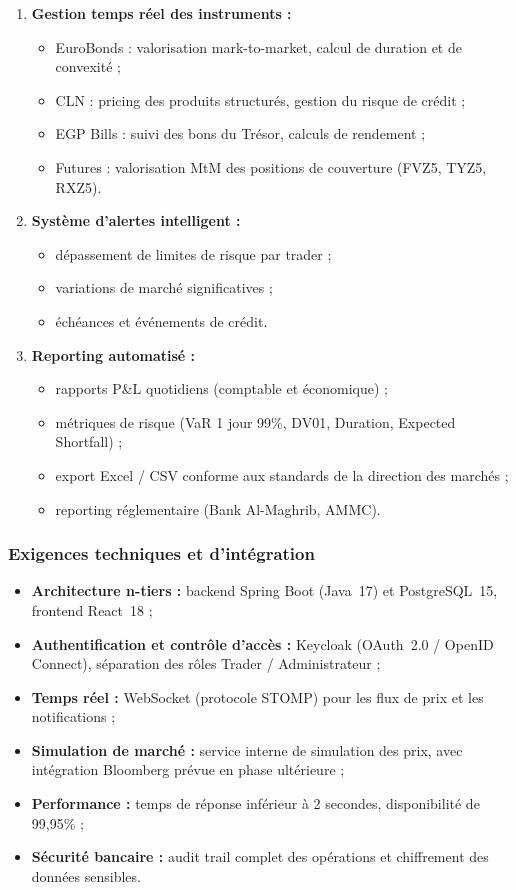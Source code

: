 \begin{enumerate}
    \item \textbf{Gestion temps réel des instruments :}
    \begin{itemize}
        \item EuroBonds : valorisation mark-to-market, calcul de duration et de convexité ;
        \item CLN : pricing des produits structurés, gestion du risque de crédit ;
        \item EGP Bills : suivi des bons du Trésor, calculs de rendement ;
        \item Futures : valorisation MtM des positions de couverture (FVZ5, TYZ5, RXZ5).
    \end{itemize}
    \item \textbf{Système d'alertes intelligent :}
    \begin{itemize}
        \item dépassement de limites de risque par trader ;
        \item variations de marché significatives ;
        \item échéances et événements de crédit.
    \end{itemize}
    \item \textbf{Reporting automatisé :}
    \begin{itemize}
        \item rapports P\&L quotidiens (comptable et économique) ;
        \item métriques de risque (VaR 1 jour 99\%, DV01, Duration, Expected Shortfall) ;
        \item export Excel / CSV conforme aux standards de la direction des marchés ;
        \item reporting réglementaire (Bank Al-Maghrib, AMMC).
    \end{itemize}
\end{enumerate}

\subsubsection{Exigences techniques et d'intégration}

\begin{itemize}
    \item \textbf{Architecture n-tiers :} backend Spring Boot (Java~17) et PostgreSQL~15, frontend React~18 ;
    \item \textbf{Authentification et contrôle d'accès :} Keycloak (OAuth~2.0 / OpenID Connect), séparation des rôles Trader / Administrateur ;
    \item \textbf{Temps réel :} WebSocket (protocole STOMP) pour les flux de prix et les notifications ;
    \item \textbf{Simulation de marché :} service interne de simulation des prix, avec intégration Bloomberg prévue en phase ultérieure ;
    \item \textbf{Performance :} temps de réponse inférieur à 2 secondes, disponibilité de 99,95\% ;
    \item \textbf{Sécurité bancaire :} audit trail complet des opérations et chiffrement des données sensibles.
\end{itemize}

